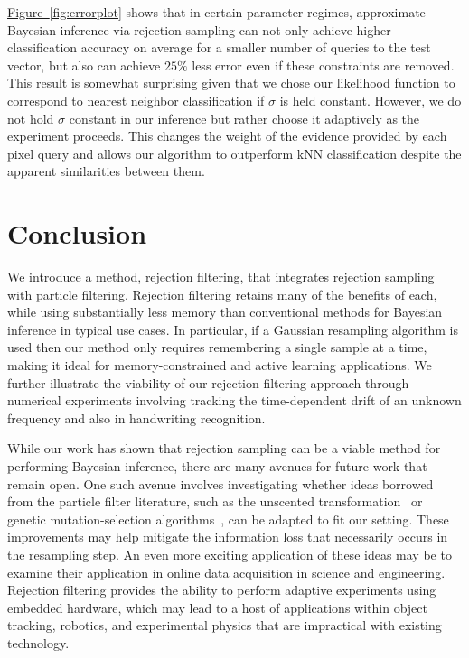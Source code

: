 \documentclass[twoside]{article}
\newcommand{\fig}[1]{\hyperref[fig:#1]{Figure~\ref*{fig:#1}}}
\begin{document}
\fig{errorplot} shows that in certain parameter regimes, approximate Bayesian inference via rejection sampling can not only achieve higher classification accuracy on average for a smaller
number of queries to the test vector, but also can achieve $25\%$ less error even if these constraints are removed.  This result is somewhat surprising given that we chose our likelihood function to correspond to nearest neighbor classification if $\sigma$ is held constant.  However, we do not hold $\sigma$ constant in our inference but rather choose it adaptively as the experiment proceeds.  This changes the weight of the evidence provided by each pixel query and allows our algorithm to outperform kNN classification despite the apparent similarities between them.

\section{Conclusion}
\label{sec:conclusions}

We introduce a method, rejection filtering, that integrates
rejection sampling with particle filtering. Rejection filtering retains many of the benefits
of each, while using substantially less memory than conventional methods for Bayesian inference in typical use cases.
In particular, if a Gaussian resampling algorithm is used then our method only requires remembering a single sample at a time, making it ideal
for memory-constrained and active learning applications.
We further illustrate the viability of our rejection filtering approach through numerical experiments
involving tracking the time-dependent drift of an unknown frequency and also in handwriting recognition.

While our work has shown that rejection sampling can be a viable method for performing Bayesian inference, there are many
avenues for future work that remain open.  One such avenue involves investigating whether ideas borrowed from the particle
filter literature, such as the unscented transformation~\cite{van2000unscented} or genetic mutation-selection algorithms~\cite{del2012adaptive,del2000branching}, can be adapted to fit our setting.
  These improvements may help mitigate the information loss that necessarily occurs in the resampling step.  An even more exciting
application of these ideas may be to examine their application in online data acquisition in science and engineering.  Rejection
filtering provides the ability to perform adaptive experiments using embedded hardware, which may lead to a host of applications
within object tracking, robotics, and experimental physics that are impractical with existing technology.
\end{document}
